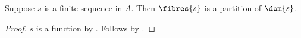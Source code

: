 \begin{corollary}\label{sequence_fibres_partition}
    Suppose $s$ is a finite sequence in $A$.
    Then $\fibres{s}$ is a partition of $\dom{s}$.
\end{corollary}
\begin{proof}
    $s$ is a function by .
    Follows by .
\end{proof}
